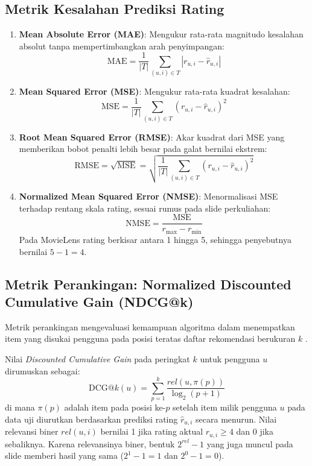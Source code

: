 \subsection{Metrik Kesalahan Prediksi Rating}
\begin{enumerate}
    \item \textbf{Mean Absolute Error (MAE)}: Mengukur rata-rata magnitudo kesalahan absolut tanpa mempertimbangkan arah penyimpangan:
    \begin{equation}
    \label{eq:mae}
    \text{MAE} = \frac{1}{|T|} \sum_{(u,i) \in T} |r_{u,i} - \hat{r}_{u,i}|
    \end{equation}
    \item \textbf{Mean Squared Error (MSE)}: Mengukur rata-rata kuadrat kesalahan:
    \begin{equation}
    \label{eq:mse}
    \text{MSE} = \frac{1}{|T|} \sum_{(u,i) \in T} (r_{u,i} - \hat{r}_{u,i})^2
    \end{equation}
    \item \textbf{Root Mean Squared Error (RMSE)}: Akar kuadrat dari MSE yang memberikan bobot penalti lebih besar pada galat bernilai ekstrem:
    \begin{equation}
    \label{eq:rmse}
    \text{RMSE} = \sqrt{\text{MSE}} = \sqrt{\frac{1}{|T|} \sum_{(u,i) \in T} (r_{u,i} - \hat{r}_{u,i})^2}
    \end{equation}
    \item \textbf{Normalized Mean Squared Error (NMSE)}: Menormalisasi MSE terhadap rentang skala rating, sesuai rumus pada slide perkuliahan:
    \begin{equation}
    \label{eq:nmse}
    \text{NMSE} = \frac{\text{MSE}}{r_{\max} - r_{\min}}
    \end{equation}
    Pada MovieLens rating berkisar antara 1 hingga 5, sehingga penyebutnya bernilai $5 - 1 = 4$.
\end{enumerate}

\subsection{Metrik Perankingan: Normalized Discounted Cumulative Gain (NDCG@k)}
Metrik perankingan mengevaluasi kemampuan algoritma dalam menempatkan item yang disukai pengguna pada posisi teratas daftar rekomendasi berukuran $k$ \citep{jarvelin2002cumulated}.

Nilai \textit{Discounted Cumulative Gain} pada peringkat $k$ untuk pengguna $u$ dirumuskan sebagai:
\begin{equation}
\label{eq:dcg}
\text{DCG}@k(u) = \sum_{p=1}^k \frac{rel(u, \pi(p))}{\log_2(p + 1)}
\end{equation}
di mana $\pi(p)$ adalah item pada posisi ke-$p$ setelah item milik pengguna $u$ pada data uji diurutkan berdasarkan prediksi rating $\hat{r}_{u,i}$ secara menurun. Nilai relevansi biner $rel(u, i)$ bernilai 1 jika rating aktual $r_{u,i} \ge 4$ dan 0 jika sebaliknya. Karena relevansinya biner, bentuk $2^{rel} - 1$ yang juga muncul pada slide memberi hasil yang sama ($2^1 - 1 = 1$ dan $2^0 - 1 = 0$).

